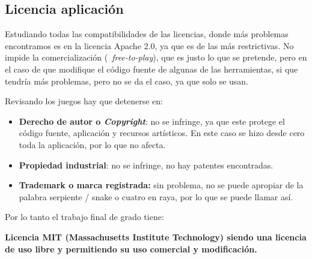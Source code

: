 \subsection{Licencia aplicación}
Estudiando todas las compatibilidades de las licencias, donde más problemas encontramos es en la licencia Apache 2.0, ya que es de las más restrictivas. No impide la comercialización (~\emph{free-to-play}), que es justo lo que se pretende, pero en el caso de que modifique el código fuente de algunas de las herramientas, si que tendría más problemas, pero no se da el caso, ya que solo se usan.

Revisando los juegos hay que detenerse en:

\begin{itemize}
	\item \textbf{Derecho de autor o \emph{Copyright}}: no se infringe, ya que este protege el código fuente, aplicación y recursos artísticos. En este caso se hizo desde cero toda la aplicación, por lo que no afecta.
	\item \textbf{Propiedad industrial}: no se infringe, no hay patentes encontradas. 
	\item \textbf{Trademark o marca registrada:} sin problema, no se puede apropiar de la palabra serpiente / snake o cuatro en raya, por lo que se puede llamar así.
\end{itemize}

Por lo tanto el trabajo final de grado tiene:
 						
\textbf{Licencia MIT (Massachusetts Institute Technology) siendo una licencia de uso libre y permitiendo su uso comercial y modificación.}




